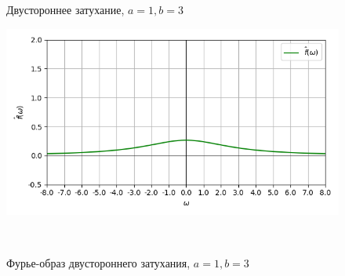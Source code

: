 \documentclass[a4paper]{article}
\begin{document}
\begin{figure}[H]
\begin{minipage}{0.5\textwidth}
        \caption{Двустороннее затухание, $a = 1, b = 3$}
    \end{minipage}\hfill
    \begin{minipage}{0.5\textwidth}
        \centering \includegraphics[width=\textwidth]{fade/real_fourier_1_3.png}
        \caption{Фурье-образ двустороннего затухания, $a = 1, b = 3$}
    \end{minipage}\\[1em]
\end{figure}\noindent\
\end{document}
